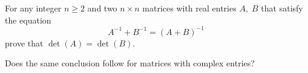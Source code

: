 For any integer \(n\ge 2\) and two \(n\times n\) matrices with real
entries \(A,\; B\) that satisfy the equation
\[A^{-1}+B^{-1}=(A+B)^{-1}\;\]
prove that \(\det (A)=\det(B)\).

Does the same conclusion follow for matrices with complex entries?